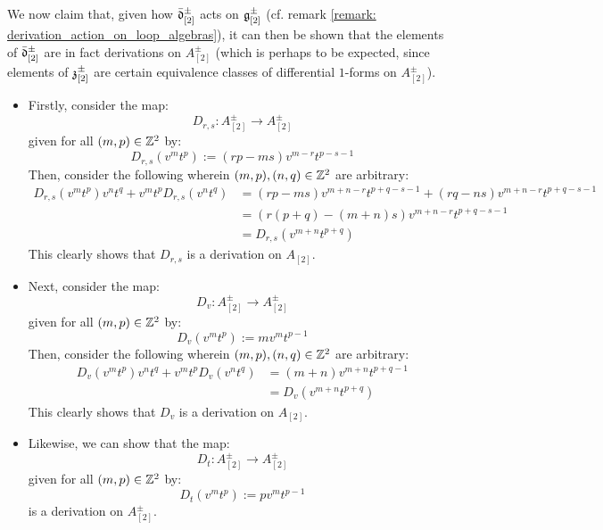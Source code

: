             \begin{remark} \label{remark: dual_of_toroidal_centres_contains_derivations}
                We now claim that, given how $\bar{\mathfrak{d}}_{[2]}^{\pm}$ acts on $\mathfrak{g}_{[2]}^{\pm}$ (cf. remark \ref{remark: derivation_action_on_loop_algebras}), it can then be shown that the elements of $\bar{\mathfrak{d}}_{[2]}^{\pm}$ are in fact derivations on $A_{[2]}^{\pm}$ (which is perhaps to be expected, since elements of $\mathfrak{z}_{[2]}^{\pm}$ are certain equivalence classes of differential $1$-forms on $A_{[2]}^{\pm}$).
                \begin{itemize}
                    \item Firstly, consider the map:
                        $$D_{r, s}: A_{[2]}^{\pm} \to A_{[2]}^{\pm}$$
                    given for all $(m, p) \in \mathbb{Z}^2$ by:
                        $$D_{r, s}(v^m t^p) := ( rp - ms ) v^{m - r} t^{p - s - 1}$$
                    Then, consider the following wherein $(m, p), (n, q) \in \mathbb{Z}^2$ are arbitrary:
                        $$
                            \begin{aligned}
                                D_{r, s}(v^m t^p) v^n t^q + v^m t^p D_{r, s}(v^n t^q) & = ( rp - ms ) v^{m + n - r} t^{p + q - s - 1} + ( rq - ns ) v^{m + n - r} t^{p + q - s - 1}
                                \\
                                & = ( r(p + q) - (m + n)s ) v^{m + n - r} t^{p + q - s - 1}
                                \\
                                & = D_{r, s}( v^{m + n} t^{p + q} )
                            \end{aligned}
                        $$
                    This clearly shows that $D_{r, s}$ is a derivation on $A_{[2]}$.
                    \item Next, consider the map:
                        $$D_v: A_{[2]}^{\pm} \to A_{[2]}^{\pm}$$
                    given for all $(m, p) \in \mathbb{Z}^2$ by:
                        $$D_v(v^m t^p) := m v^m t^{p - 1}$$
                    Then, consider the following wherein $(m, p), (n, q) \in \mathbb{Z}^2$ are arbitrary:
                        $$
                            \begin{aligned}
                                D_v(v^m t^p) v^n t^q + v^m t^p D_v(v^n t^q) & = (m + n) v^{m + n} t^{p + q - 1}
                                \\
                                & = D_v( v^{m + n} t^{p + q} )
                            \end{aligned}
                        $$
                    This clearly shows that $D_v$ is a derivation on $A_{[2]}$.
                    \item Likewise, we can show that the map:
                        $$D_t: A_{[2]}^{\pm} \to A_{[2]}^{\pm}$$
                    given for all $(m, p) \in \mathbb{Z}^2$ by:
                        $$D_t(v^m t^p) := p v^m t^{p - 1}$$
                    is a derivation on $A_{[2]}^{\pm}$.
                \end{itemize}


\end{remark}
